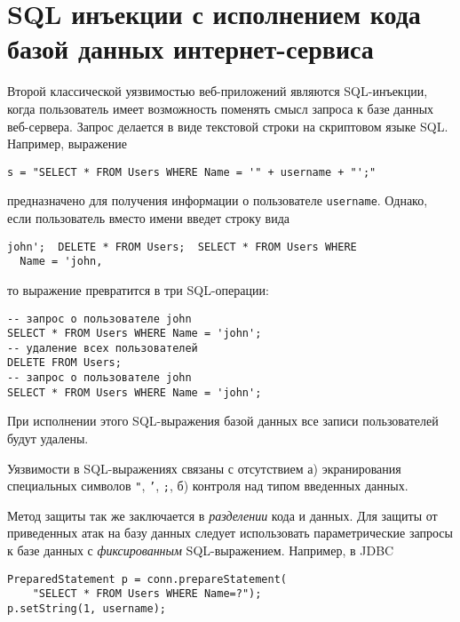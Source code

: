 \section[SQL инъекции с исполнением кода вебсервером]{SQL инъекции с исполнением кода \protect\\ базой данных интернет-сервиса}

Второй классической уязвимостью веб-приложений являются SQL-инъекции, когда пользователь имеет возможность поменять смысл запроса к базе данных веб-сервера. Запрос делается в виде текстовой строки на скриптовом языке SQL.  Например, выражение
\begin{verbatim}
s = "SELECT * FROM Users WHERE Name = '" + username + "';"
\end{verbatim}
предназначено для получения информации о пользователе \texttt{username}. Однако, если пользователь вместо имени введет строку вида
\begin{center} \begin{verbatim}
john';  DELETE * FROM Users;  SELECT * FROM Users WHERE
  Name = 'john,
\end{verbatim} \end{center}
то выражение превратится в три SQL-операции:
\begin{verbatim}
-- запрос о пользователе john
SELECT * FROM Users WHERE Name = 'john';
-- удаление всех пользователей
DELETE FROM Users;
-- запрос о пользователе john
SELECT * FROM Users WHERE Name = 'john';
\end{verbatim}
При исполнении этого SQL-выражения базой данных все записи пользователей будут удалены.

Уязвимости в SQL-выражениях связаны с отсутствием а) экранирования специальных символов \texttt{"},  \texttt{'},  \texttt{;}, б) контроля над типом введенных данных.

Метод защиты так же заключается в \emph{разделении} кода и данных. Для защиты от приведенных атак на базу данных следует использовать параметрические запросы к базе данных с \emph{фиксированным} SQL-выражением. Например, в JDBC
\begin{verbatim}
PreparedStatement p = conn.prepareStatement(
    "SELECT * FROM Users WHERE Name=?");
p.setString(1, username);
\end{verbatim}
